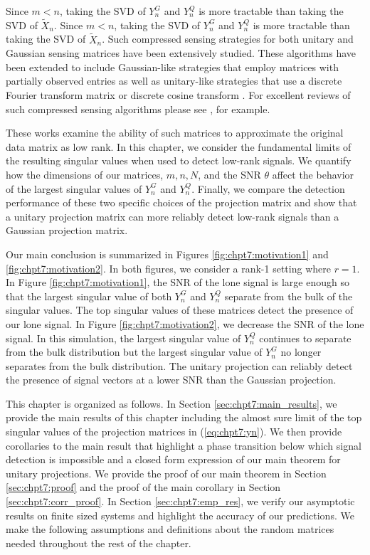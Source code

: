 Since $m<n$, taking the SVD of $Y_n^G$ and $Y_n^Q$ is more tractable than taking the SVD
of $\widetilde{X}_n$.  Since $m<n$, taking the SVD of $Y_n^G$ and $Y_n^Q$ is more tractable than taking the SVD
of $\widetilde{X}_n$. Such compressed sensing strategies for both unitary
\cite{belabbas2007fast,gu1996efficient,rudelson2007sampling} and Gaussian
\cite{hehyperspectral,rokhlin2009randomized,halko2011algorithm} sensing matrices have been
extensively studied. These algorithms have been extended to include Gaussian-like
strategies that employ matrices with partially observed entries
\cite{achlioptas2007fast,arora2006fast} as well as unitary-like strategies that use a
discrete Fourier transform matrix \cite{liberty2007randomized} or discrete cosine transform
\cite{ramachandra2011compressive}. For excellent reviews of such compressed sensing
algorithms please see \cite{halko2011finding,candes2006near,donoho2006compressed}, for
example. 

These works examine the ability of such matrices to approximate the original data matrix
as low rank. In this chapter, we consider the fundamental limits of the resulting singular
values when used to detect low-rank signals. We quantify how the dimensions of our
matrices, $m,n,N$, and the SNR $\theta$ affect the behavior of the largest singular values
of $Y_n^G$ and $Y_n^Q$. Finally, we compare the detection performance of these two
specific choices of the projection matrix and show that a unitary projection matrix can
more reliably detect low-rank signals than a Gaussian projection matrix.

Our main conclusion is summarized in Figures \ref{fig:chpt7:motivation1} and
\ref{fig:chpt7:motivation2}. In both figures, we consider a rank-1 setting where $r=1$. In
Figure \ref{fig:chpt7:motivation1}, the SNR of the lone signal is large enough so that the
largest singular value of both $Y_n^G$ and $Y_n^Q$ separate from the bulk of the singular
values. The top singular values of these matrices detect the presence of our lone
signal. In Figure \ref{fig:chpt7:motivation2}, we decrease the SNR of the lone signal. In
this simulation, the largest singular value of $Y_n^Q$ continues to separate from the bulk
distribution but the largest singular value of $Y_n^G$ no longer separates from the bulk
distribution. The unitary projection can reliably detect the presence of signal vectors at
a lower SNR than the Gaussian projection.

This chapter is organized as follows. In Section \ref{sec:chpt7:main_results}, we provide
the main results of this chapter including the almost sure limit of the top singular
values of the projection matrices in (\ref{eq:chpt7:yn}). We then provide corollaries to
the main result that highlight a phase transition below which signal detection is
impossible and a closed form expression of our main theorem for unitary projections. We
provide the proof of our main theorem in Section \ref{sec:chpt7:proof} and the proof of the
main corollary in Section \ref{sec:chpt7:corr_proof}. In Section \ref{sec:chpt7:emp_res},
we verify our asymptotic results on finite sized systems and highlight the accuracy of our
predictions. We make the following assumptions and definitions about the random
matrices needed throughout the rest of the chapter.

